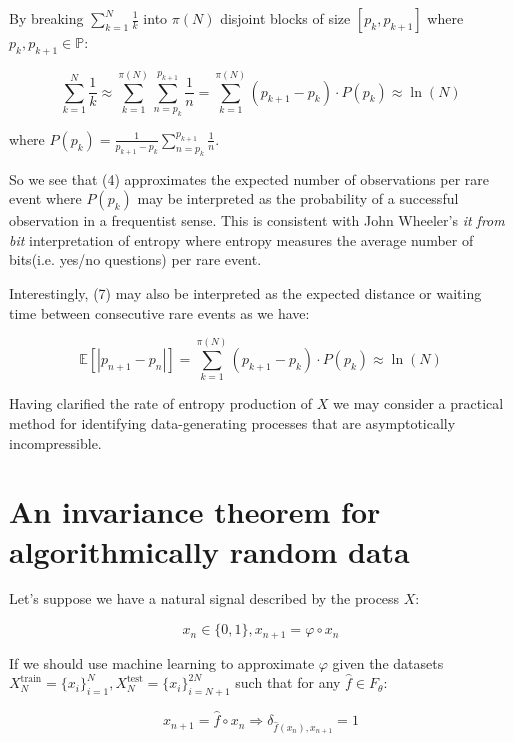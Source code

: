 \documentclass{article}
\begin{document}
By breaking $\sum_{k=1}^N \frac{1}{k}$ into $\pi(N)$ disjoint blocks of size $[p_k,p_{k+1}]$ where $p_k, p_{k+1} \in \mathbb{P}$: 

\begin{equation}
\sum_{k=1}^N \frac{1}{k}	 \approx \sum_{k=1}^{\pi(N)} \sum_{n=p_k}^{p_{k+1}} \frac{1}{n} = \sum_{k=1}^{\pi(N)} (p_{k+1}-p_k) \cdot P(p_k) \approx \ln(N)
\end{equation}

where $P(p_k)= \frac{1}{p_{k+1}-p_k}\sum_{n=p_k}^{p_{k+1}} \frac{1}{n}$. 

So we see that (4) approximates the expected number of observations per rare event where $P(p_k)$ may be interpreted as the probability of a successful observation in a frequentist sense. This is consistent with John Wheeler's \textit{it from bit} interpretation of entropy where entropy measures the average number of bits(i.e. yes/no questions) per rare event. 

Interestingly, (7) may also be interpreted as the expected distance or waiting time between consecutive rare events as we have: 

\begin{equation}
\mathbb{E}[|p_{n+1} -p_n|] = \sum_{k=1}^{\pi(N)} (p_{k+1}-p_k) \cdot P(p_k) \approx \ln(N) 	
\end{equation}

Having clarified the rate of entropy production of $X$ we may consider a practical method for identifying data-generating processes that are asymptotically incompressible. 

\newpage

\section{An invariance theorem for algorithmically random data}

Let's suppose we have a natural signal described by the process $X$: 

\begin{equation}
x_n \in \{0,1\}, x_{n+1} = \varphi \circ x_n 	
\end{equation}

If we should use machine learning to approximate $\varphi$ given the datasets 
$X_N^{\text{train}}= \{x_i\}_{i=1}^N,X_N^{\text{test}}= \{x_i\}_{i=N+1}^{2N}$
such that for any $\hat{f} \in F_{\theta}$: 

\begin{equation}
x_{n+1} = \hat{f} \circ x_n \Rightarrow \delta_{\hat{f}(x_n),x_{n+1}} = 1	
\end{equation}
\end{document}
